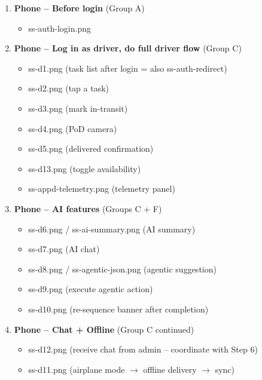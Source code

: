 \documentclass[11pt,a4paper]{article}
\newcommand{\checkbox}{$\square$\;}
\begin{document}
\begin{enumerate}[label=\textbf{Step \arabic*:}, leftmargin=3.5em]
  \item \textbf{Phone -- Before login} (Group A)
  \begin{itemize}[nosep]
    \item[\checkbox] ss-auth-login.png
  \end{itemize}

  \item \textbf{Phone -- Log in as driver, do full driver flow} (Group C)
  \begin{itemize}[nosep]
    \item[\checkbox] ss-d1.png (task list after login = also ss-auth-redirect)
    \item[\checkbox] ss-d2.png (tap a task)
    \item[\checkbox] ss-d3.png (mark in-transit)
    \item[\checkbox] ss-d4.png (PoD camera)
    \item[\checkbox] ss-d5.png (delivered confirmation)
    \item[\checkbox] ss-d13.png (toggle availability)
    \item[\checkbox] ss-appd-telemetry.png (telemetry panel)
  \end{itemize}

  \item \textbf{Phone -- AI features} (Groups C + F)
  \begin{itemize}[nosep]
    \item[\checkbox] ss-d6.png / ss-ai-summary.png (AI summary)
    \item[\checkbox] ss-d7.png (AI chat)
    \item[\checkbox] ss-d8.png / ss-agentic-json.png (agentic suggestion)
    \item[\checkbox] ss-d9.png (execute agentic action)
    \item[\checkbox] ss-d10.png (re-sequence banner after completion)
  \end{itemize}

  \item \textbf{Phone -- Chat + Offline} (Group C continued)
  \begin{itemize}[nosep]
    \item[\checkbox] ss-d12.png (receive chat from admin -- coordinate with Step 6)
    \item[\checkbox] ss-d11.png (airplane mode $\to$ offline delivery $\to$ sync)
  \end{itemize}


\end{enumerate}
\end{document}
